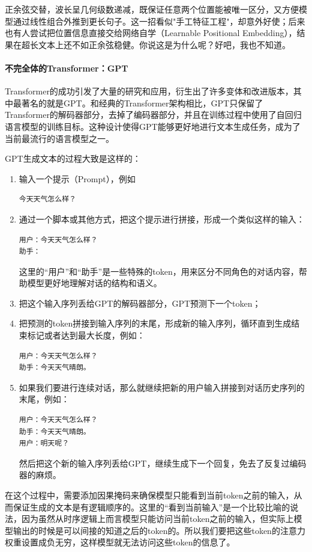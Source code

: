正余弦交替，波长呈几何级数递减，既保证任意两个位置能被唯一区分，又方便模型通过线性组合外推到更长句子。这一招看似"手工特征工程"，却意外好使；后来也有人尝试把位置信息直接交给网络自学（Learnable Positional Embedding），结果在超长文本上还不如正余弦稳健。你说这是为什么呢？好吧，我也不知道。

\paragraph{不完全体的Transformer：GPT}

Transformer的成功引发了大量的研究和应用，衍生出了许多变体和改进版本，其中最著名的就是GPT。和经典的Transformer架构相比，GPT只保留了Transformer的解码器部分，去掉了编码器部分，并且在训练过程中使用了自回归语言模型的训练目标。这种设计使得GPT能够更好地进行文本生成任务，成为了当前最流行的语言模型之一。

GPT生成文本的过程大致是这样的：
\begin{enumerate}
    \item 输入一个提示（Prompt），例如
\begin{verbatim}
今天天气怎么样？
\end{verbatim}
    \item 通过一个脚本或其他方式，把这个提示进行拼接，形成一个类似这样的输入：
\begin{verbatim}
用户：今天天气怎么样？
助手：
\end{verbatim}
    这里的“用户”和“助手”是一些特殊的token，用来区分不同角色的对话内容，帮助模型更好地理解对话的结构和语义。
    \item 把这个输入序列丢给GPT的解码器部分，GPT预测下一个token；
    \item 把预测的token拼接到输入序列的末尾，形成新的输入序列，循环直到生成结束标记或者达到最大长度，例如：
\begin{verbatim}
用户：今天天气怎么样？
助手：今天天气晴朗。
\end{verbatim}
    \item 如果我们要进行连续对话，那么就继续把新的用户输入拼接到对话历史序列的末尾，例如：
\begin{verbatim}
用户：今天天气怎么样？
助手：今天天气晴朗。
用户：明天呢？
\end{verbatim}
    然后把这个新的输入序列丢给GPT，继续生成下一个回复，免去了反复过编码器的麻烦。
\end{enumerate}
在这个过程中，需要添加因果掩码来确保模型只能看到当前token之前的输入，从而保证生成的文本是有逻辑顺序的。这里的“看到当前输入”是一个比较比喻的说法，因为虽然从时序逻辑上而言模型只能访问当前token之前的输入，但实际上模型输出的时候是可以间接的知道之后的token的。所以我们要把这些token的注意力权重设置成负无穷，这样模型就无法访问这些token的信息了。

